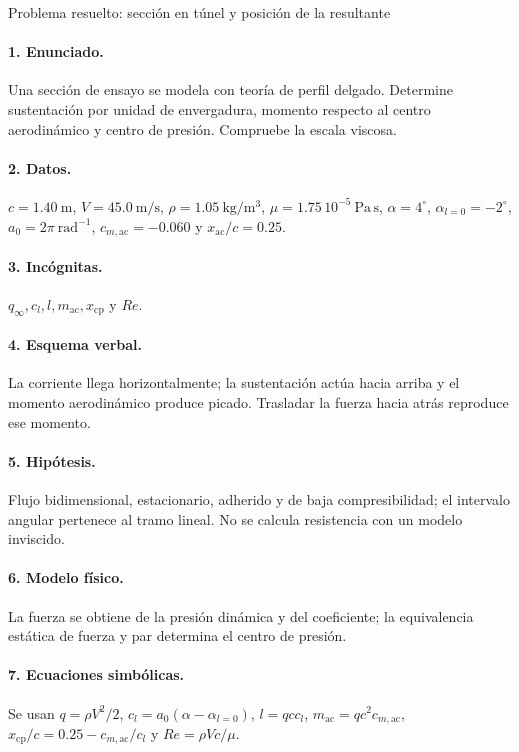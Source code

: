 \begin{studiumworked}{Problema resuelto: sección en túnel y posición de la resultante}

\paragraph{1. Enunciado.} Una sección de ensayo se modela con teoría de perfil delgado. Determine sustentación por unidad de envergadura, momento respecto al centro aerodinámico y centro de presión. Compruebe la escala viscosa.
\paragraph{2. Datos.} $c=1.40\ \mathrm m$, $V=45.0\ \mathrm{m/s}$, $\rho=1.05\ \mathrm{kg/m^3}$, $\mu=1.75\,10^{-5}\ \mathrm{Pa\,s}$, $\alpha=4^\circ$, $\alpha_{l=0}=-2^\circ$, $a_0=2\pi\ \mathrm{rad^{-1}}$, $c_{m,\mathrm{ac}}=-0.060$ y $x_{\mathrm{ac}}/c=0.25$.
\paragraph{3. Incógnitas.} $q_\infty,c_l,l,m_{\mathrm{ac}},x_{\mathrm{cp}}$ y $Re$.
\paragraph{4. Esquema verbal.} La corriente llega horizontalmente; la sustentación actúa hacia arriba y el momento aerodinámico produce picado. Trasladar la fuerza hacia atrás reproduce ese momento.
\paragraph{5. Hipótesis.} Flujo bidimensional, estacionario, adherido y de baja compresibilidad; el intervalo angular pertenece al tramo lineal. No se calcula resistencia con un modelo inviscido.
\paragraph{6. Modelo físico.} La fuerza se obtiene de la presión dinámica y del coeficiente; la equivalencia estática de fuerza y par determina el centro de presión.
\paragraph{7. Ecuaciones simbólicas.} Se usan $q=\rho V^2/2$, $c_l=a_0(\alpha-\alpha_{l=0})$, $l=qcc_l$, $m_{\mathrm{ac}}=qc^2c_{m,\mathrm{ac}}$, $x_{\mathrm{cp}}/c=0.25-c_{m,\mathrm{ac}}/c_l$ y $Re=\rho Vc/\mu$.

\end{studiumworked}
